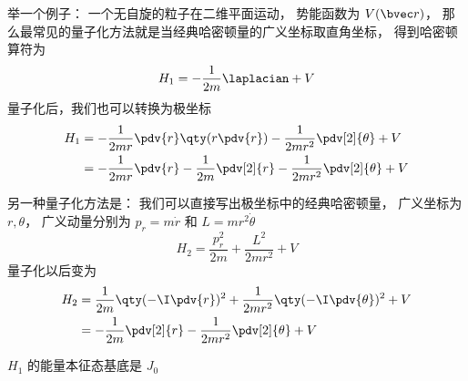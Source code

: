 
\begin{issues}
\issueDraft
\end{issues}

举一个例子： 一个无自旋的粒子在二维平面运动， 势能函数为 $V(\bvec r)$， 那么最常见的量子化方法就是当经典哈密顿量的广义坐标取直角坐标， 得到哈密顿算符为
\begin{equation}
H_1 = -\frac{1}{2m} \laplacian + V
\end{equation}
量子化后，我们也可以转换为极坐标
\begin{equation}
\begin{aligned}
H_1 &= -\frac{1}{2mr}\pdv{r}\qty(r \pdv{r}) - \frac{1}{2mr^2} \pdv[2]{\theta} + V\\
&= -\frac{1}{2mr}\pdv{r} -\frac{1}{2m}\pdv[2]{r} - \frac{1}{2mr^2} \pdv[2]{\theta} + V
\end{aligned}
\end{equation}

另一种量子化方法是： 我们可以直接写出极坐标中的经典哈密顿量， 广义坐标为 $r, \theta$， 广义动量分别为 $p_r = m\dot r$ 和 $L = mr^2\dot\theta$
\begin{equation}
H_2 = \frac{p_r^2}{2m} + \frac{L^2}{2mr^2} + V
\end{equation}
量子化以后变为
\begin{equation}
\begin{aligned}
H_2 &= \frac{1}{2m}\qty(-\I\pdv{r})^2 + \frac{1}{2mr^2}\qty(-\I\pdv{\theta})^2 + V\\
&= -\frac{1}{2m}\pdv[2]{r} - \frac{1}{2mr^2} \pdv[2]{\theta} + V
\end{aligned}
\end{equation}


$H_1$ 的能量本征态基底是 $J_0$